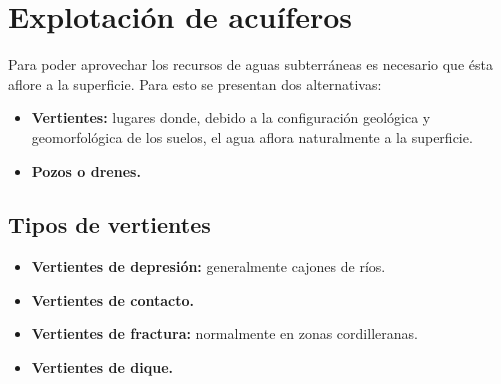 \section{Explotación de acuíferos}

Para poder aprovechar los recursos de aguas subterráneas es necesario que
ésta aflore a la superficie. Para esto se presentan dos alternativas:
\begin{itemize}
  \item \textbf{Vertientes:} lugares donde, debido a la configuración geológica
        y geomorfológica de los suelos, el agua aflora naturalmente a la superficie.
  \item \textbf{Pozos o drenes.}
\end{itemize}

\subsection{Tipos de vertientes}
\begin{itemize}
  \item \textbf{Vertientes de depresión:} generalmente cajones de ríos.
  \item \textbf{Vertientes de contacto.}
  \item \textbf{Vertientes de fractura:} normalmente en zonas cordilleranas.
  \item \textbf{Vertientes de dique.}
\end{itemize}

